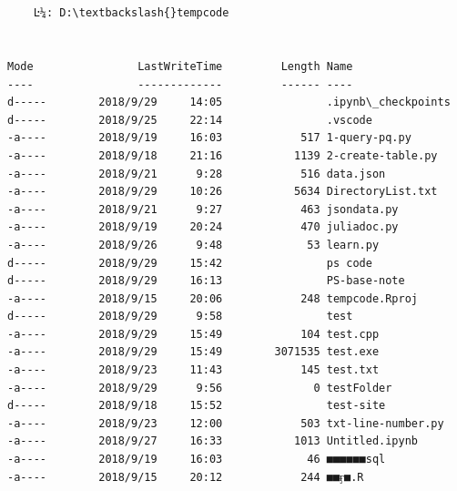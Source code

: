 \documentclass[11pt]{ctexart}
\begin{document}
    \begin{Verbatim}[commandchars=\\\{\}]


    Ŀ¼: D:\textbackslash{}tempcode


Mode                LastWriteTime         Length Name                                                                  
----                -------------         ------ ----                                                                  
d-----        2018/9/29     14:05                .ipynb\_checkpoints                                                    
d-----        2018/9/25     22:14                .vscode                                                               
-a----        2018/9/19     16:03            517 1-query-pq.py                                                         
-a----        2018/9/18     21:16           1139 2-create-table.py                                                     
-a----        2018/9/21      9:28            516 data.json                                                             
-a----        2018/9/29     10:26           5634 DirectoryList.txt                                                     
-a----        2018/9/21      9:27            463 jsondata.py                                                           
-a----        2018/9/19     20:24            470 juliadoc.py                                                           
-a----        2018/9/26      9:48             53 learn.py                                                              
d-----        2018/9/29     15:42                ps code                                                               
d-----        2018/9/29     16:13                PS-base-note                                                          
-a----        2018/9/15     20:06            248 tempcode.Rproj                                                        
d-----        2018/9/29      9:58                test                                                                  
-a----        2018/9/29     15:49            104 test.cpp                                                              
-a----        2018/9/29     15:49        3071535 test.exe                                                              
-a----        2018/9/23     11:43            145 test.txt                                                              
-a----        2018/9/29      9:56              0 testFolder                                                            
d-----        2018/9/18     15:52                test-site                                                             
-a----        2018/9/23     12:00            503 txt-line-number.py                                                    
-a----        2018/9/27     16:33           1013 Untitled.ipynb                                                        
-a----        2018/9/19     16:03             46 ■■■■■■sql                                                          
-a----        2018/9/15     20:12            244 ■■ӻ■.R                                                              



    \end{Verbatim}
\end{document}

